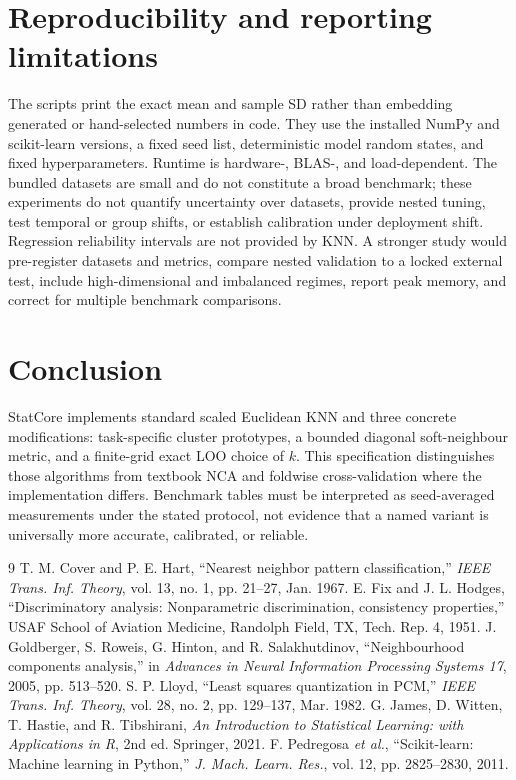 \documentclass[conference]{IEEEtran}
\begin{document}
\section{Reproducibility and reporting limitations}
The scripts print the exact mean and sample SD rather than embedding generated or hand-selected numbers in code. They use the installed NumPy and scikit-learn versions, a fixed seed list, deterministic model random states, and fixed hyperparameters. Runtime is hardware-, BLAS-, and load-dependent. The bundled datasets are small and do not constitute a broad benchmark; these experiments do not quantify uncertainty over datasets, provide nested tuning, test temporal or group shifts, or establish calibration under deployment shift. Regression reliability intervals are not provided by KNN. A stronger study would pre-register datasets and metrics, compare nested validation to a locked external test, include high-dimensional and imbalanced regimes, report peak memory, and correct for multiple benchmark comparisons.

\section{Conclusion}
StatCore implements standard scaled Euclidean KNN and three concrete modifications: task-specific cluster prototypes, a bounded diagonal soft-neighbour metric, and a finite-grid exact LOO choice of $k$. This specification distinguishes those algorithms from textbook NCA and foldwise cross-validation where the implementation differs. Benchmark tables must be interpreted as seed-averaged measurements under the stated protocol, not evidence that a named variant is universally more accurate, calibrated, or reliable.

\begin{thebibliography}{9}
 T. M. Cover and P. E. Hart, ``Nearest neighbor pattern classification,'' \emph{IEEE Trans. Inf. Theory}, vol. 13, no. 1, pp. 21--27, Jan. 1967.
 E. Fix and J. L. Hodges, ``Discriminatory analysis: Nonparametric discrimination, consistency properties,'' USAF School of Aviation Medicine, Randolph Field, TX, Tech. Rep. 4, 1951.
 J. Goldberger, S. Roweis, G. Hinton, and R. Salakhutdinov, ``Neighbourhood components analysis,'' in \emph{Advances in Neural Information Processing Systems 17}, 2005, pp. 513--520.
 S. P. Lloyd, ``Least squares quantization in PCM,'' \emph{IEEE Trans. Inf. Theory}, vol. 28, no. 2, pp. 129--137, Mar. 1982.
 G. James, D. Witten, T. Hastie, and R. Tibshirani, \emph{An Introduction to Statistical Learning: with Applications in R}, 2nd ed. Springer, 2021.
 F. Pedregosa \emph{et al.}, ``Scikit-learn: Machine learning in Python,'' \emph{J. Mach. Learn. Res.}, vol. 12, pp. 2825--2830, 2011.
\end{thebibliography}
\end{document}
